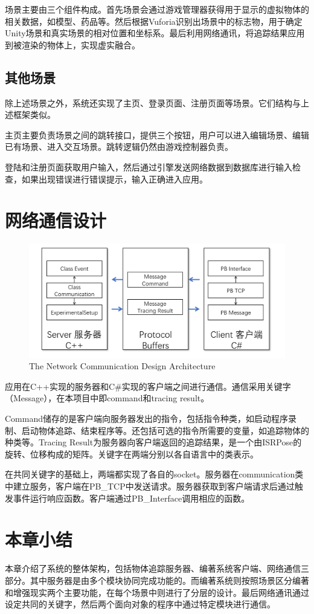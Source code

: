 场景主要由三个组件构成。首先场景会通过游戏管理器获得用于显示的虚拟物体的相关数据，如模型、药品等。然后根据Vuforia识别出场景中的标志物，用于确定Unity场景和真实场景的相对位置和坐标系。最后利用网络通讯，将追踪结果应用到被渲染的物体上，实现虚实融合。


\subsection{其他场景}
除上述场景之外，系统还实现了主页、登录页面、注册页面等场景。它们结构与上述框架类似。

主页主要负责场景之间的跳转接口，提供三个按钮，用户可以进入编辑场景、编辑已有场景、进入交互场景。跳转逻辑仍然由游戏控制器负责。

登陆和注册页面获取用户输入，然后通过引擎发送网络数据到数据库进行输入检查，如果出现错误进行错误提示，输入正确进入应用。

\section{网络通信设计}
\begin{figure}[!htp]
  \centering
  \includegraphics[width=12cm]{figure/netarc.png}
    {The Network Communication Design Architecture}
 \label{fig:gm}
\end{figure}
应用在C++实现的服务器和C\#实现的客户端之间进行通信。通信采用关键字（Message），在本项目中即command和tracing result。

Command储存的是客户端向服务器发出的指令，包括指令种类，如启动程序录制、启动物体追踪、结束程序等。还包括可选的指令所需要的变量，如追踪物体的种类等。Tracing Result为服务器向客户端返回的追踪结果，是一个由ISRPose的旋转、位移构成的矩阵。关键字在两端分别以各自语言中的类表示。

在共同关键字的基础上，两端都实现了各自的socket。服务器在communication类中建立服务，客户端在PB\_TCP中发送请求。服务器获取到客户端请求后通过触发事件运行响应函数。客户端通过PB\_Interface调用相应的函数。

\section{本章小结}
本章介绍了系统的整体架构，包括物体追踪服务器、编著系统客户端、网络通信三部分。其中服务器是由多个模块协同完成功能的。而编著系统则按照场景区分编著和增强现实两个主要功能，在每个场景中则进行了分层的设计。最后网络通讯通过设定共同的关键字，然后两个面向对象的程序中通过特定模块进行通信。
